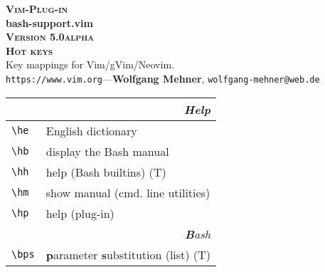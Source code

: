 \documentclass[oneside,11pt,landscape,DIV16]{scrartcl}
\newcommand{\Pluginversion}{5.0alpha}
\begin{document}
%

\begin{multicols}{3}
%
\begin{center}
%
\textbf{\textsc{\small{Vim-Plug-in}}}\\
\textbf{\LARGE{bash-support.vim}}\\
\textbf{\textsc{\small{Version \Pluginversion}}}\\
\vspace{1mm}%
\textbf{\textsc{\Huge{Hot keys}}}\\ 
\vspace{1mm}%
Key mappings for Vim/gVim/Neovim.\\
{\tiny  \texttt{https://www.vim.org}\hspace{1.5mm}---\hspace{1.5mm}\textbf{Wolfgang Mehner},  \texttt{wolfgang-mehner@web.de}}\\
\vspace{1.0mm}
%
\begin{tabular}[]{|p{11mm}|p{60mm}|}
\hline
\multicolumn{2}{|r|}{\textsl{\textbf{H}elp}}\\[1.0ex]
\hline \verb'\he'   & English dictionary                \\
\hline \verb'\hb'   & display the Bash manual           \\
\hline \verb'\hh'   & help (Bash builtins)              \hfill (T)\\
\hline \verb'\hm'   & show manual (cmd. line utilities) \\
\hline \verb'\hp'   & help (plug-in)                    \\
\hline
\hline 
\multicolumn{2}{|r|}{\textsl{\textbf{B}ash}}\\[1.0ex]
\hline \verb'\bps'   & \textbf{p}arameter \textbf{s}ubstitution (list) \hfill (T)\\

\end{tabular}
\end{center}
\end{multicols}
\end{document}
